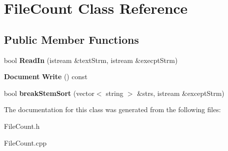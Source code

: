 \section{File\+Count Class Reference}
\label{class_file_count}
\subsection*{Public Member Functions}
\begin{DoxyCompactItemize}
\item 
\mbox{\label{class_file_count_a150c9f46c820f56d682b65b881ccada0}} 
bool {\bfseries Read\+In} (istream \&text\+Strm, istream \&execpt\+Strm)
\item 
\mbox{\label{class_file_count_afb5d00dda3d7cda5e2c70b3ca862551d}} 
\textbf{ Document} {\bfseries Write} () const
\item 
\mbox{\label{class_file_count_add1a9daed1345b642d5c925be059a4a3}} 
bool {\bfseries break\+Stem\+Sort} (vector$<$ string $>$ \&strs, istream \&except\+Strm)
\end{DoxyCompactItemize}


The documentation for this class was generated from the following files\+:\begin{DoxyCompactItemize}
\item 
File\+Count.\+h\item 
File\+Count.\+cpp\end{DoxyCompactItemize}
